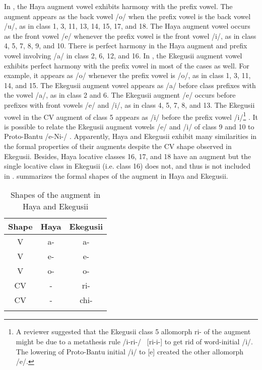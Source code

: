 \documentclass[output=paper]{langscibook}
\begin{document}
In , the Haya augment vowel exhibits harmony with the prefix vowel. The augment appears as the back vowel /o/ when the prefix vowel is the back vowel /u/, as in class 1, 3, 11, 13, 14, 15, 17, and 18. The Haya augment vowel occurs as the front vowel /e/ whenever the prefix vowel is the front vowel /i/, as in class 4, 5, 7, 8, 9, and 10. There is perfect harmony in the Haya augment and prefix vowel involving /a/ in class 2, 6, 12, and 16. In , the Ekegusii augment vowel exhibits perfect harmony with the prefix vowel in most of the cases as well. For example, it appears as /o/ whenever the prefix vowel is /o/, as in class 1, 3, 11, 14, and 15. The Ekegusii augment vowel appears as /a/ before class prefixes with the vowel /a/, as in class 2 and 6. The Ekegusii augment /e/ occurs before prefixes with front vowels /e/ and /i/, as in class 4, 5, 7, 8, and 13. The Ekegusii vowel in the CV augment of class 5 appears as /i/ before the prefix vowel /i/\footnote{A reviewer suggested that the Ekegusii class 5 allomorph ri- of the augment might be due to a metathesis rule /i-ri-/ \rightarrow\ [ri-i-] to get rid of word-initial /i/. The lowering of Proto-Bantu initial /i/ to [e] created the other allomorph /e/.} . It is possible to relate the Ekegusii augment vowels /e/ and /i/ of class 9 and 10 to Proto-Bantu /e-Ni-/ \citep[35]{chagas1977}. Apparently, Haya and Ekegusii exhibit many similarities in the formal properties of their augments despite the CV shape observed in Ekegusii. Besides, Haya locative classes 16, 17, and 18 have an augment but the single locative class in Ekegusii (i.e. class 16) does not, and thus is not included in .  summarizes the formal shapes of the augment in Haya and Ekegusii.\largerpage[-2]

\begin{table}
    \begin{tabular}{ccc}
    \lsptoprule
      Shape   &  Haya & Ekegusii\\\midrule
        V & a- & a- \\
        V & e- & e- \\
        V & o- & o- \\
    CV & - & ri- \\
    CV & - & chi- \\
    \lspbottomrule
    \end{tabular}
    \caption{Shapes of the augment in Haya and Ekegusii}
    \label{tab:1l}
\end{table}
\end{document}
